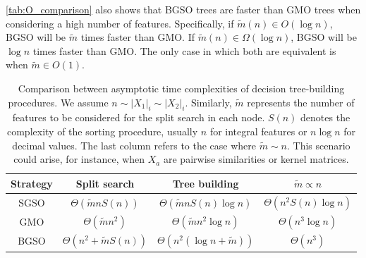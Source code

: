 \autoref{tab:O_comparison} also shows that BGSO trees are faster than GMO trees when considering a high number of features. Specifically, if $\tilde m(n) \in O(\log n)$, BGSO will be $\tilde m$ times faster than GMO. If $\tilde m(n) \in \Omega(\log n)$, BGSO will be $\log n$ times faster than GMO. The only case in which both are equivalent is when $\tilde m \in O(1)$.



\begin{table}[tb]
    \caption{
        Comparison between asymptotic time complexities of decision tree-building procedures.
        We assume $n \sim |X_1|_i \sim |X_2|_i$.
        Similarly, $\tilde m$ represents the number of features to be considered for the split search in each node.
        $S(n)$ denotes the complexity of the sorting procedure, usually $n$ for integral features or $n \log n$ for decimal values.
        The last column refers to the case where $\tilde m \sim n$. This scenario could arise, for instance, when $X_a$ are pairwise similarities or kernel matrices. 
    }
    \centering
    \begin{tabular}{c|c|c|c}
        \toprule
        Strategy
            & Split search
            & Tree building
            & $\tilde m \propto n$
        \\
        \midrule 
        SGSO
            & $\Theta(\tilde m n S(n))$
            & $\Theta(\tilde m n S(n) \log n)$
            & $\Theta(n^2 S(n) \log n)$
        \\
        GMO
            & $\Theta(\tilde m n^2)$
            & $\Theta(\tilde m n^2 \log n)$
            & $\Theta(n^3 \log n)$
        \\
        BGSO
            & $\Theta(n^2 + \tilde m S(n))$
            & $\Theta(n^2 (\log n + \tilde m))$
            & $\Theta(n^3)$
        \\
        \bottomrule
    \end{tabular}
    \newline {}
    \label{tab:O_comparison}
\end{table}

